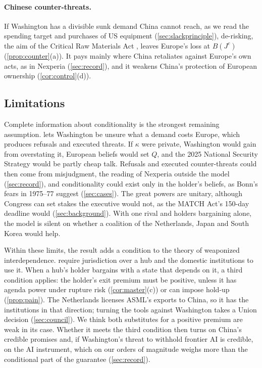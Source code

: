 \paragraph{Chinese counter-threats.} If Washington has a divisible sunk demand China cannot reach, as we read the spending target and purchases of US equipment (\cref{sec:slackprinciple}), de-risking, the aim of the Critical Raw Materials Act \citep{eu2024crma}, leaves Europe's loss at $B(J^c)$ (\cref{prop:counter}(a)). It pays mainly where China retaliates against Europe's own acts, as in Nexperia (\cref{sec:record}), and it weakens China's protection of European ownership (\cref{cor:control}(d)).

\subsection{Limitations}\label{sec:limits}

Complete information about conditionality is the strongest remaining assumption.  lets Washington be unsure what a demand costs Europe, which produces refusals and executed threats. If $\kappa$ were private, Washington would gain from overstating it, European beliefs would set $Q$, and the 2025 National Security Strategy would be partly cheap talk. Refusals and executed counter-threats could then come from misjudgment, the reading of Nexperia outside the model (\cref{sec:record}), and conditionality could exist only in the holder's beliefs, as Bonn's fears in 1975--77 suggest (\cref{sec:cases}). The great powers are unitary, although Congress can set stakes the executive would not, as the MATCH Act's 150-day deadline would (\cref{sec:background}). With one rival and holders bargaining alone, the model is silent on whether a coalition of the Netherlands, Japan and South Korea would help.

Within these limits, the result adds a condition to the theory of weaponized interdependence. \citet{farrell2019weaponized} require jurisdiction over a hub and the domestic institutions to use it. When a hub's holder bargains with a state that depends on it, a third condition applies: the holder's exit premium must be positive, unless it has agenda power under rupture risk (\cref{cor:master}(c)) or can impose hold-up (\cref{prop:pain}). The Netherlands licenses ASML's exports to China, so it has the institutions in that direction; turning the tools against Washington takes a Union decision (\cref{sec:council}). We think both substitutes for a positive premium are weak in its case. Whether it meets the third condition then turns on China's credible promises and, if Washington's threat to withhold frontier AI is credible, on the AI instrument, which on our orders of magnitude weighs more than the conditional part of the guarantee (\cref{sec:record}).
